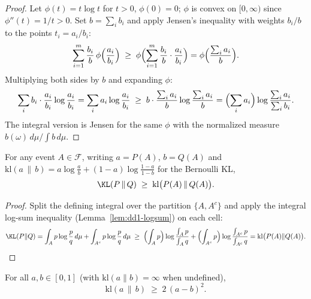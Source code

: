 \begin{proof}
Let $\phi(t) = t \log t$ for $t > 0$, $\phi(0) = 0$; $\phi$ is convex on
$[0, \infty)$ since $\phi''(t) = 1/t > 0$. Set $b = \sum_i b_i$ and apply
Jensen's inequality with weights $b_i / b$ to the points $t_i = a_i / b_i$:
\[
\sum_{i=1}^m \frac{b_i}{b}\, \phi\Bigl( \frac{a_i}{b_i} \Bigr)
\;\ge\; \phi\Bigl( \sum_{i=1}^m \frac{b_i}{b} \cdot \frac{a_i}{b_i} \Bigr)
= \phi\Bigl( \frac{\sum_i a_i}{b} \Bigr).
\]
Multiplying both sides by $b$ and expanding $\phi$:
\[
\sum_i b_i \cdot \frac{a_i}{b_i} \log\frac{a_i}{b_i}
= \sum_i a_i \log \frac{a_i}{b_i}
\;\ge\; b \cdot \frac{\sum_i a_i}{b} \log \frac{\sum_i a_i}{b}
= \Bigl(\sum_i a_i\Bigr) \log \frac{\sum_i a_i}{\sum_i b_i}.
\]
The integral version is Jensen for the same $\phi$ with the normalized
measure $b(\omega)\,d\mu / \int b \, d\mu$.
\end{proof}

\begin{lemma}
\label{lem:dd1-dataproc}
For any event $A \in \mathcal{F}$, writing $a = P(A)$, $b = Q(A)$ and
$\mathrm{kl}(a \,\|\, b) = a \log\frac{a}{b} + (1-a)\log\frac{1-a}{1-b}$ for
the Bernoulli KL,
\begin{equation}
\label{eq:dd1-dataproc}
\KL(P \,\|\, Q) \;\ge\; \mathrm{kl}\bigl( P(A) \,\|\, Q(A) \bigr).
\end{equation}
\end{lemma}

\begin{proof}
Split the defining integral over the partition $\{A, A^c\}$ and apply the
integral log-sum inequality (Lemma~\ref{lem:dd1-logsum}) on each cell:
\[
\KL(P\|Q)
= \int_A p \log \frac{p}{q}\, d\mu + \int_{A^c} p \log \frac{p}{q}\, d\mu
\;\ge\; \Bigl(\int_A p\Bigr) \log \frac{\int_A p}{\int_A q}
+ \Bigl(\int_{A^c} p\Bigr) \log \frac{\int_{A^c} p}{\int_{A^c} q}
= \mathrm{kl}\bigl(P(A) \| Q(A)\bigr). \qedhere
\]
\end{proof}

\begin{lemma}
\label{lem:dd1-scalar-pinsker}
For all $a, b \in [0, 1]$ (with $\mathrm{kl}(a\|b) = \infty$ when undefined),
\begin{equation}
\label{eq:dd1-scalar-pinsker}
\mathrm{kl}(a \,\|\, b) \;\ge\; 2\,(a - b)^2 .
\end{equation}
\end{lemma}

